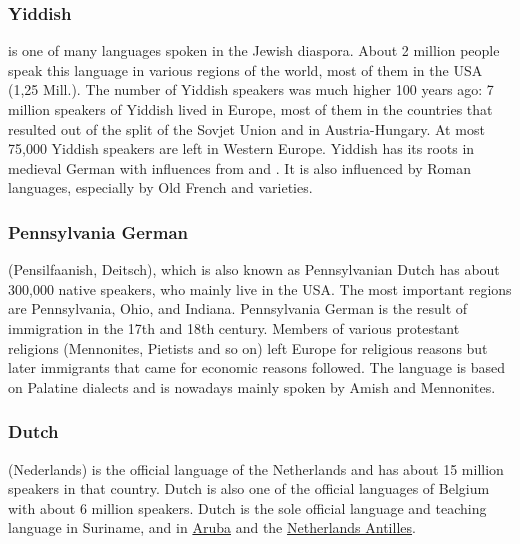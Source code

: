 \subsubsection{Yiddish}

 is one of many languages spoken in the Jewish diaspora. About 2 million people speak this language in various
regions of the world, most of them in the USA (1,25 Mill.). The number of Yiddish speakers was much
higher 100 years ago: 7 million speakers of Yiddish lived in Europe, most of them in the countries
that resulted out of the split of the Sovjet Union and in
Austria-Hungary. At most 75,000 Yiddish speakers are left in Western Europe. Yiddish has its roots
in medieval German with influences from  and . It is also influenced by
Roman languages, especially by Old French and  varieties.




\subsubsection{Pennsylvania German}

 (Pensilfaanish, Deitsch), which is also known as Pennsylvanian Dutch has about 300,000
native speakers, who mainly live in the USA. The most important regions are Pennsylvania, Ohio, and
Indiana. Pennsylvania German is the result of immigration in the 17th and 18th century. Members of
various protestant religions (Mennonites, Pietists and so on) left Europe for religious reasons  
but later immigrants that came for economic reasons followed.  The language is
based on Palatine dialects and is nowadays mainly spoken by Amish and Mennonites.




\subsubsection{Dutch}

 (Nederlands) is the  official language of the Netherlands and has about 15 million speakers in that country. Dutch is also one of the official languages of Belgium with about 6 million speakers.
Dutch is the sole official language and teaching language in Suriname, 
and in \href{https://en.wikipedia.org/wiki/Aruba}{Aruba} and the \href{https://en.wikipedia.org/wiki/Netherlands_Antilles}{Netherlands Antilles}.

